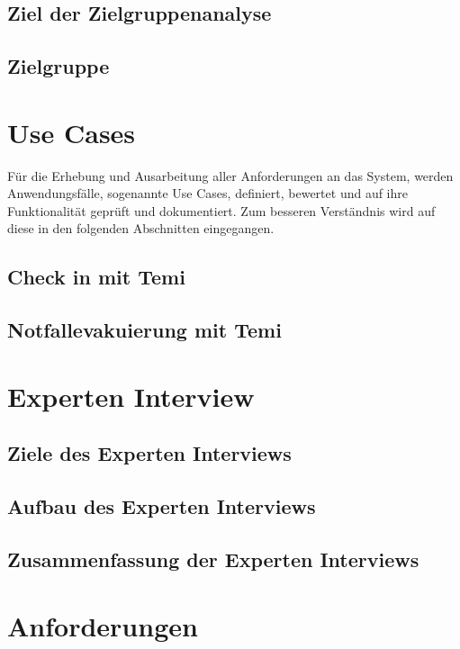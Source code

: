     \subsection{Ziel der Zielgruppenanalyse}
    \subsection{Zielgruppe}

\section{Use Cases}
\label{sec:usecases}
    Für die Erhebung und Ausarbeitung aller Anforderungen an das System, werden Anwendungsfälle, sogenannte Use Cases, 
    definiert, bewertet und auf ihre Funktionalität geprüft und dokumentiert. Zum besseren Verständnis wird auf diese in den 
    folgenden Abschnitten eingegangen. 
\subsection{Check in mit Temi}
\subsection{Notfallevakuierung mit Temi}
\section{Experten Interview}
\label{sec:experteninterviewReqirements}
\subsection{Ziele des Experten Interviews}
\subsection{Aufbau des Experten Interviews}
\subsection{Zusammenfassung der Experten Interviews}
\section{Anforderungen}
